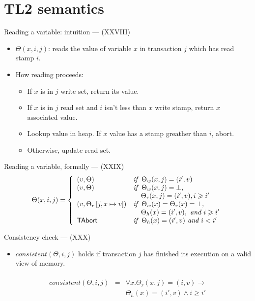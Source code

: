 \documentclass[14pt]{beamer}
\renewcommand{\geq}{\geqslant}
\newcommand{\C}[1]{\red{\mathsf{#1}}}
\begin{document}
     \section{TL2 semantics}
     \begin{frame}{Reading a variable: intuition --- (XXVIII)}
        \begin{itemize}
           \item $\Theta(x,i,j)$: reads the value of variable $x$ in transaction $j$ which has
            read stamp $i$.
           \item How reading proceeds:
           \begin{itemize}
              \item If $x$ is in $j$ write set, return its value.
              \item If $x$ is in $j$ read set and $i$ isn't less than $x$
                      write stamp, return $x$ associated value.
              \item Lookup value in heap. If $x$ value has a stamp greather than $i$, abort.
              \item Otherwise, update read-set.
           \end{itemize}
        \end{itemize}
     \end{frame}
     \begin{frame}{Reading a variable, formally --- (XXIX)}
\begingroup
\everymath{\scriptstyle}
\large
  \[
  \Theta(x,i,j) = \left\{
  \begin{array}{ll}
     (v,\Theta) & \textit{if }\:\Theta_w(x,j) = (i',v)\\
     (v,\Theta) & \textit{if }\:\Theta_w(x,j) = \bot,\\
                & \:\:\:\:\:\Theta_r(x,j) = (i',v), i \geq i' \\
     (v, \Theta_r\,[j,x \mapsto v]) & 
        \textit{if }\:\Theta_w(x) = \Theta_r(x) = \bot,\\
                                       & \:\:\:\:\:  \Theta_h(x) = (i',v),
                                     \textit{ and } i \geq i' \\
                           \ensuremath{\C{TAbort}} & \textit{if }\: \Theta_h(x) = (i',v)
                                    \textit{ and } i < i'
  \end{array}
                                  \right.
  \]        

\endgroup
     \end{frame}
     \begin{frame}{Consistency check --- (XXX)}
        \begin{itemize}
           \item $consistent(\Theta,i,j)$ holds if transaction $j$ has finished its execution
                 on a valid view of memory.
        \end{itemize}
  \[
     \begin{array}{lcl}
\\
        consistent(\Theta,i,j) & = & \forall x. \Theta_r(x,j) = (i,v) \to \\
      & & \Theta_h(x) = (i',v) \land i \geq i'
     \end{array}
  \]
     \end{frame}
\end{document}
